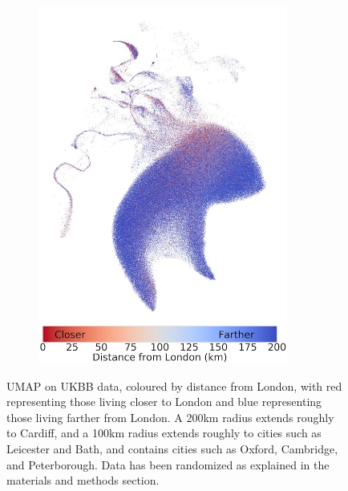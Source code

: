 \documentclass[12pt]{pnas-new}
\begin{document}
\begin{figure}
    \centering
    \begin{subfigure}{0.9\textwidth}
    \includegraphics[width=0.9\textwidth]{images/UKBB_UMAP_PC10_NN15_MD05_2018328174511_london_permuted_10nn_sd10_base1_maxdist200_2019625172227_resize.jpeg}
    \end{subfigure}
    \caption{UMAP on UKBB data, coloured by distance from London, with red representing those living closer to London and blue representing those living farther from London. A 200km radius extends roughly to Cardiff, and a 100km radius extends roughly to cities such as Leicester and Bath, and contains cities such as Oxford, Cambridge, and Peterborough. Data has been randomized as explained in the materials and methods section.}
    \label{fig:supp_london_distance}
\end{figure}
\end{document}
